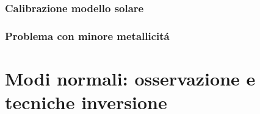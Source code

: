 \documentclass[../main.tex]{subfiles}
\begin{document}
\begin{refsection}
\subsection{Calibrazione modello solare}

\subsection{Problema con minore metallicit\'a}

\end{refsection}


\chapter{Modi normali: osservazione e tecniche inversione}

\begin{comment}
\begin{refsection}[cox.bib,SModes.bib,VstarsRev.bib,waves.bib,HAseismRev.bib,HelioInversion.bib,innocenti.bib]
\nocite{*}
\begingroup
\let\clearpage\relax
\printbibliography
\endgroup

\section{Problematiche osservative}

\subsection{Doppler measurement: resonant scattering cell (GOLF)}

\begin{refsegment}

\nocite{*}
\begingroup
\let\clearpage\relax
\printbibliography[keyword={doppler}]
\endgroup

\end{refsegment}

\subsection{separazione contributi modi}

\subsection{Frequency precision}

\section{Misurazione spitting dei modi dovuto alla rotazione e campi magnetici interni}


\end{comment}
\end{document}
